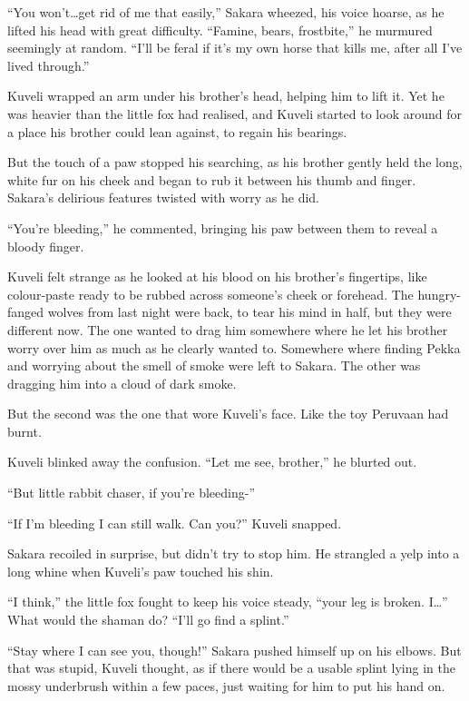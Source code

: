 ``You won't\ldots{}get rid of me that easily,'' Sakara wheezed, his voice hoarse, as he lifted his head with great difficulty. ``Famine, bears, frostbite,'' he murmured seemingly at random. ``I'll be feral if it's my own horse that kills me, after all I've lived through.''

Kuveli wrapped an arm under his brother's head, helping him to lift it. Yet he was heavier than the little fox had realised, and Kuveli started to look around for a place his brother could lean against, to regain his bearings.

But the touch of a paw stopped his searching, as his brother gently held the long, white fur on his cheek and began to rub it between his thumb and finger. Sakara's delirious features twisted with worry as he did.

``You're bleeding,'' he commented, bringing his paw between them to reveal a bloody finger.

Kuveli felt strange as he looked at his blood on his brother's fingertips, like colour-paste ready to be rubbed across someone's cheek or forehead. The hungry-fanged wolves from last night were back, to tear his mind in half, but they were different now. The one wanted to drag him somewhere where he let his brother worry over him as much as he clearly wanted to. Somewhere where finding Pekka and worrying about the smell of smoke were left to Sakara. The other was dragging him into a cloud of dark smoke.

But the second was the one that wore Kuveli's face. Like the toy Peruvaan had burnt.

Kuveli blinked away the confusion. ``Let me see, brother,'' he blurted out.

``But little rabbit chaser, if you're bleeding-''

``If I'm bleeding I can still walk. Can you?'' Kuveli snapped.

Sakara recoiled in surprise, but didn't try to stop him. He strangled a yelp into a long whine when Kuveli's paw touched his shin.

``I think,'' the little fox fought to keep his voice steady, ``your leg is broken. I\ldots'' What would the shaman do? ``I'll go find a splint.''

``Stay where I can see you, though!'' Sakara pushed himself up on his elbows. But that was stupid, Kuveli thought, as if there would be a usable splint lying in the mossy underbrush within a few paces, just waiting for him to put his hand on.

